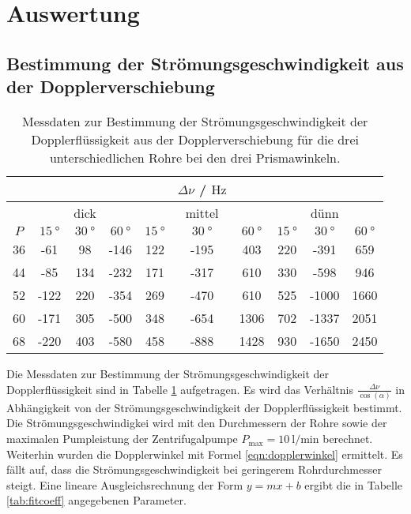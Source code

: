 \section{Auswertung}
\label{sec:Auswertung}
\subsection{Bestimmung der Strömungsgeschwindigkeit aus der Dopplerverschiebung}
\begin{table}
	\centering
	\caption{Messdaten zur Bestimmung der Strömungsgeschwindigkeit der Dopplerflüssigkeit aus der Dopplerverschiebung für die drei unterschiedlichen Rohre bei den drei Prismawinkeln.}
	\label{tab:aufgabeA}
	\begin{tabular}{cccccccccc}
		\toprule
		& & & & & $\Delta \nu$ / $\si{\hertz}$ & & & & \\
		\midrule
		& & dick & & & mittel & & & dünn & \\
		\midrule
		$P$ & $\SI{15}{\degree}$ & $\SI{30}{\degree}$ & $\SI{60}{\degree}$ & $\SI{15}{\degree}$ & $\SI{30}{\degree}$ & $\SI{60}{\degree}$ & $\SI{15}{\degree}$ & $\SI{30}{\degree}$ & $\SI{60}{\degree}$ \\
		\midrule
		36 & -61 & 98 & -146 & 122 & -195 & 403 & 220 & -391 & 659 \\
		44 & -85 & 134 & -232 & 171 & -317 & 610 & 330 & -598 & 946 \\
		52 & -122 & 220 & -354 & 269 & -470 & 610 & 525 & -1000 & 1660 \\
		60 & -171 & 305 & -500 & 348 & -654 & 1306 & 702 & -1337 & 2051 \\
		68 & -220 & 403 & -580 & 458 & -888 & 1428 & 930 & -1650 & 2450 \\
		\bottomrule
	\end{tabular}
\end{table}
Die Messdaten zur Bestimmung der Strömungsgeschwindigkeit der Dopplerflüssigkeit sind
in Tabelle \ref{tab:aufgabeA} aufgetragen.
Es wird das Verhältnis $\frac{\Delta \nu}{\cos(\alpha)}$ in Abhängigkeit von der
Strömungsgeschwindigkeit der Dopplerflüssigkeit bestimmt. Die Strömungsgeschwindigkei
wird mit den Durchmessern der Rohre sowie der maximalen Pumpleistung der Zentrifugalpumpe
$P_{\mathrm{max}} = \SI{10}{\litre\per\minute}$ berechnet. Weiterhin wurden die
Dopplerwinkel mit Formel \eqref{eqn:dopplerwinkel} ermittelt.
Es fällt auf, dass die Strömungsgeschwindigkeit bei geringerem Rohrdurchmesser steigt.
Eine lineare Ausgleichsrechnung der Form $y=mx+b$ ergibt die in Tabelle \ref{tab:fitcoeff}
angegebenen Parameter.
